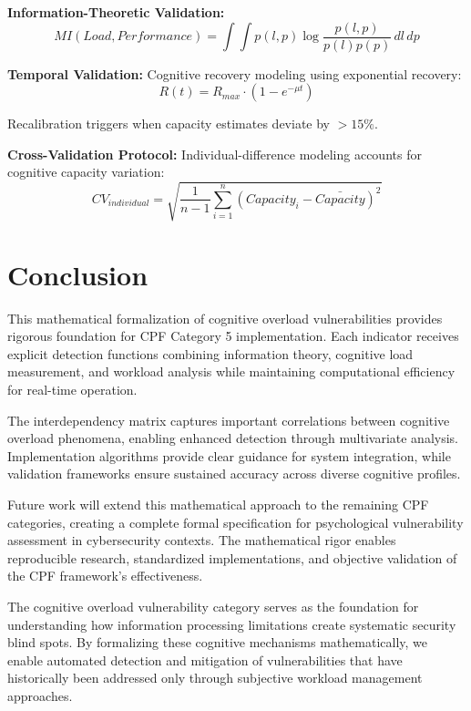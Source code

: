 \documentclass[11pt,a4paper]{article}
\begin{document}
\textbf{Information-Theoretic Validation:}
\begin{equation}
MI(Load, Performance) = \int \int p(l,p) \log \frac{p(l,p)}{p(l)p(p)} \, dl \, dp
\end{equation}

\textbf{Temporal Validation:}
Cognitive recovery modeling using exponential recovery:
\begin{equation}
R(t) = R_{max} \cdot (1 - e^{-\mu t})
\end{equation}

Recalibration triggers when capacity estimates deviate by $>15\%$.

\textbf{Cross-Validation Protocol:}
Individual-difference modeling accounts for cognitive capacity variation:
\begin{equation}
CV_{individual} = \sqrt{\frac{1}{n-1} \sum_{i=1}^{n} (Capacity_i - \bar{Capacity})^2}
\end{equation}

\section{Conclusion}

This mathematical formalization of cognitive overload vulnerabilities provides rigorous foundation for CPF Category 5 implementation. Each indicator receives explicit detection functions combining information theory, cognitive load measurement, and workload analysis while maintaining computational efficiency for real-time operation.

The interdependency matrix captures important correlations between cognitive overload phenomena, enabling enhanced detection through multivariate analysis. Implementation algorithms provide clear guidance for system integration, while validation frameworks ensure sustained accuracy across diverse cognitive profiles.

Future work will extend this mathematical approach to the remaining CPF categories, creating a complete formal specification for psychological vulnerability assessment in cybersecurity contexts. The mathematical rigor enables reproducible research, standardized implementations, and objective validation of the CPF framework's effectiveness.

The cognitive overload vulnerability category serves as the foundation for understanding how information processing limitations create systematic security blind spots. By formalizing these cognitive mechanisms mathematically, we enable automated detection and mitigation of vulnerabilities that have historically been addressed only through subjective workload management approaches.
\end{document}
